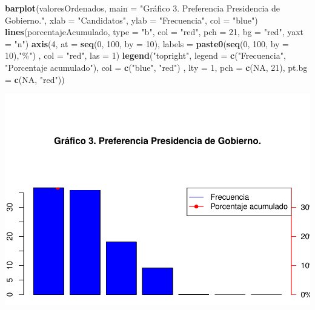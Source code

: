 \documentclass[
]{article}
\newenvironment{Shaded}{\begin{snugshade}}{\end{snugshade}}
\newcommand{\AttributeTok}[1]{\textcolor[rgb]{0.13,0.29,0.53}{#1}}
\newcommand{\ConstantTok}[1]{\textcolor[rgb]{0.56,0.35,0.01}{#1}}
\newcommand{\DecValTok}[1]{\textcolor[rgb]{0.00,0.00,0.81}{#1}}
\newcommand{\FunctionTok}[1]{\textcolor[rgb]{0.13,0.29,0.53}{\textbf{#1}}}
\newcommand{\NormalTok}[1]{#1}
\newcommand{\StringTok}[1]{\textcolor[rgb]{0.31,0.60,0.02}{#1}}
\begin{document}
\begin{Shaded}
\begin{Highlighting}[]
\FunctionTok{barplot}\NormalTok{(valoresOrdenados, }\AttributeTok{main =} \StringTok{"Gráfico 3. Preferencia Presidencia de Gobierno."}\NormalTok{, }
        \AttributeTok{xlab =} \StringTok{"Candidatos"}\NormalTok{, }\AttributeTok{ylab =} \StringTok{"Frecuencia"}\NormalTok{, }\AttributeTok{col =} \StringTok{"blue"}\NormalTok{)}
        \FunctionTok{lines}\NormalTok{(porcentajeAcumulado, }
                \AttributeTok{type =} \StringTok{"b"}\NormalTok{, }\AttributeTok{col =} \StringTok{"red"}\NormalTok{, }\AttributeTok{pch =} \DecValTok{21}\NormalTok{, }\AttributeTok{bg =} \StringTok{"red"}\NormalTok{, }\AttributeTok{yaxt =} \StringTok{"n"}\NormalTok{)}
        \FunctionTok{axis}\NormalTok{(}\DecValTok{4}\NormalTok{, }\AttributeTok{at =} \FunctionTok{seq}\NormalTok{(}\DecValTok{0}\NormalTok{, }\DecValTok{100}\NormalTok{, }\AttributeTok{by =} \DecValTok{10}\NormalTok{), }\AttributeTok{labels =} \FunctionTok{paste0}\NormalTok{(}\FunctionTok{seq}\NormalTok{(}\DecValTok{0}\NormalTok{, }\DecValTok{100}\NormalTok{, }\AttributeTok{by =} \DecValTok{10}\NormalTok{),}\StringTok{"\%"}\NormalTok{)}
\NormalTok{              , }\AttributeTok{col =} \StringTok{"red"}\NormalTok{, }\AttributeTok{las =} \DecValTok{1}\NormalTok{)}
\FunctionTok{legend}\NormalTok{(}\StringTok{"topright"}\NormalTok{, }\AttributeTok{legend =} \FunctionTok{c}\NormalTok{(}\StringTok{"Frecuencia"}\NormalTok{, }\StringTok{"Porcentaje acumulado"}\NormalTok{), }\AttributeTok{col =} \FunctionTok{c}\NormalTok{(}\StringTok{"blue"}\NormalTok{, }\StringTok{"red"}\NormalTok{)}
\NormalTok{       , }\AttributeTok{lty =} \DecValTok{1}\NormalTok{, }\AttributeTok{pch =} \FunctionTok{c}\NormalTok{(}\ConstantTok{NA}\NormalTok{, }\DecValTok{21}\NormalTok{), }\AttributeTok{pt.bg =} \FunctionTok{c}\NormalTok{(}\ConstantTok{NA}\NormalTok{, }\StringTok{"red"}\NormalTok{))}
\end{Highlighting}
\end{Shaded}

\includegraphics{preferenciaPte_files/figure-latex/graficoPareto-1.pdf}
\newpage
\end{document}
